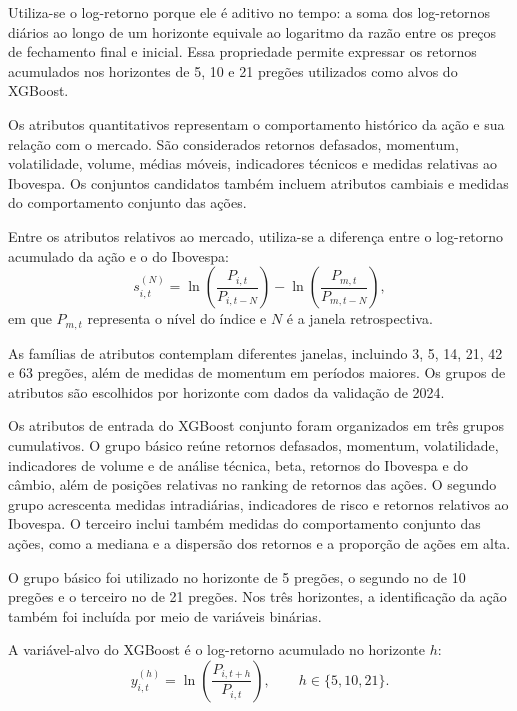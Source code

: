 Utiliza-se o log-retorno porque ele é aditivo no tempo:
a soma dos log-retornos diários ao longo de um horizonte
equivale ao logaritmo da razão entre os preços de
fechamento final e inicial. Essa propriedade permite
expressar os retornos acumulados nos horizontes de
5, 10 e 21 pregões utilizados como alvos do XGBoost.

Os atributos quantitativos representam o comportamento
histórico da ação e sua relação com o mercado. São
considerados retornos defasados, momentum, volatilidade,
volume, médias móveis, indicadores técnicos e medidas
relativas ao Ibovespa. Os conjuntos candidatos também
incluem atributos cambiais e medidas do comportamento
conjunto das ações.

Entre os atributos relativos ao mercado, utiliza-se
a diferença entre o log-retorno acumulado da ação e
o do Ibovespa:
\begin{equation}
s_{i,t}^{(N)}
=
\ln\left(\frac{P_{i,t}}{P_{i,t-N}}\right)
-
\ln\left(\frac{P_{m,t}}{P_{m,t-N}}\right),
\label{eq:spread_retorno_cap4}
\end{equation}
em que $P_{m,t}$ representa o nível do índice e $N$
é a janela retrospectiva.

As famílias de atributos contemplam diferentes janelas,
incluindo 3, 5, 14, 21, 42 e 63 pregões, além de medidas
de momentum em períodos maiores. Os grupos de atributos
são escolhidos por horizonte com dados da validação
de 2024.

Os atributos de entrada do XGBoost conjunto foram
organizados em três grupos cumulativos. O grupo básico
reúne retornos defasados, momentum, volatilidade, indicadores
de volume e de análise técnica, beta, retornos do Ibovespa
e do câmbio, além de posições relativas no ranking de
retornos das ações. O segundo grupo acrescenta medidas
intradiárias, indicadores de risco e retornos relativos
ao Ibovespa. O terceiro inclui também medidas do
comportamento conjunto das ações, como a mediana e a
dispersão dos retornos e a proporção de ações em alta.

O grupo básico foi utilizado no horizonte de 5 pregões,
o segundo no de 10 pregões e o terceiro no de 21 pregões.
Nos três horizontes, a identificação da ação também foi
incluída por meio de variáveis binárias.

A variável-alvo do XGBoost é o log-retorno acumulado
no horizonte $h$:
\begin{equation}
    y_{i,t}^{(h)}
    =
    \ln\left(\frac{P_{i,t+h}}{P_{i,t}}\right),
    \qquad h\in\{5,10,21\}.
    \label{eq:alvo_cap4}
\end{equation}

